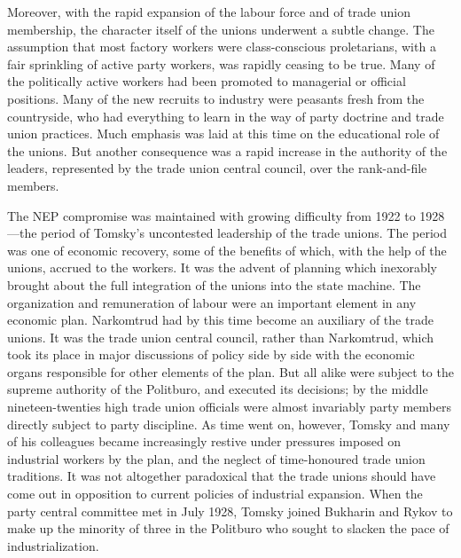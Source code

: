 Moreover, with the rapid expansion of the labour force and of trade union membership, the character itself of the unions underwent a subtle change. The assumption that most factory workers were class-conscious proletarians, with a fair sprinkling of active party workers, was rapidly ceasing to be true. Many of the politically active workers had been promoted to managerial or official positions. Many of the new recruits to industry were peasants fresh from the countryside, who had everything to learn in the way of party doctrine and trade union practices. Much emphasis was laid at this time on the educational role of the unions. But another consequence was a rapid increase in the authority of the leaders, represented by the trade union central council, over the rank-and-file members. 

The NEP compromise was maintained with growing difficulty from 1922 to 1928---the period of Tomsky's uncontested leadership of the trade unions. The period was one of economic recovery, some of the benefits of which, with the help of the unions, accrued to the workers. It was the advent of planning which inexorably brought about the full integration of the unions into the state machine. The organization and remuneration of labour were an important element in any economic plan. Narkomtrud had by this time become an auxiliary of the trade unions. It was the trade union central council, rather than Narkomtrud, which took its place in major discussions of policy side by side with the economic organs responsible for other elements of the plan. But all alike were subject to the supreme authority of the Politburo, and executed its decisions; by the middle nineteen-twenties high trade union officials were almost invariably party members directly subject to party discipline. As time went on, however, Tomsky and many of his colleagues became increasingly restive under pressures imposed on industrial workers by the plan, and the neglect of time-honoured trade union traditions. It was not altogether paradoxical that the trade unions should have come out in opposition to current policies of industrial expansion. When the party central committee met in July 1928, Tomsky joined Bukharin and Rykov to make up the minority of three in the Politburo who sought to slacken the pace of industrialization. 

